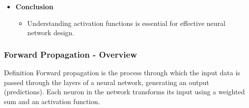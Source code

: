 \documentclass[aspectratio=169]{beamer}
\begin{document}
\begin{frame}[fragile]
\begin{itemize}
        \item \textbf{Conclusion}
            \begin{itemize}
                \item Understanding activation functions is essential for effective neural network design.
            \end{itemize}
    \end{itemize}
\end{frame}

\begin{frame}[fragile]
    \frametitle{Forward Propagation - Overview}
    \begin{block}{Definition}
        Forward propagation is the process through which the input data is passed through the layers of a neural network, generating an output (predictions). Each neuron in the network transforms its input using a weighted sum and an activation function.
    \end{block}
\end{frame}
\end{document}
